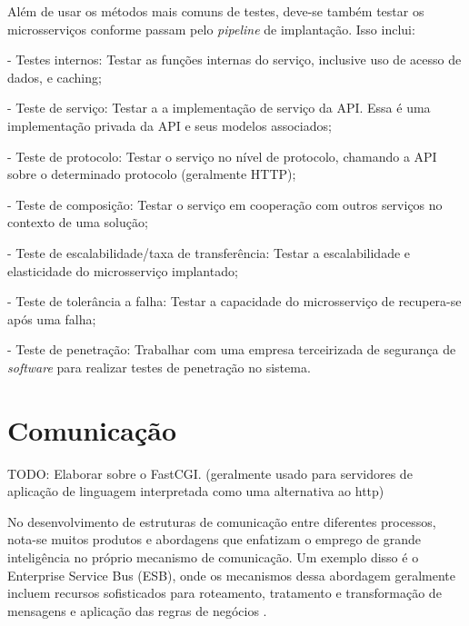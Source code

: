 
Além de usar os métodos mais comuns de testes, deve-se também testar os microsserviços conforme passam pelo \emph{pipeline} de implantação. Isso inclui: \cite{Familiar2015}

- Testes internos: Testar as funções internas do serviço, inclusive uso de acesso de dados, e caching;

- Teste de serviço: Testar a a implementação de serviço da API. Essa é uma implementação privada da API e seus modelos associados;

- Teste de protocolo: Testar o serviço no nível de protocolo, chamando a API sobre o determinado protocolo (geralmente HTTP);

- Teste de composição: Testar o serviço em cooperação com outros serviços no contexto de uma solução;

- Teste de escalabilidade/taxa de transferência: Testar a escalabilidade e elasticidade do microsserviço implantado;

- Teste de tolerância a falha: Testar a capacidade do microsserviço de recupera-se após uma falha;

- Teste de penetração: Trabalhar com uma empresa terceirizada de segurança de \emph{software} para realizar testes de penetração no sistema.

\section{Comunicação}

TODO: Elaborar sobre o FastCGI. (geralmente usado para servidores de aplicação de linguagem interpretada como uma alternativa ao http)

No desenvolvimento de estruturas de comunicação entre diferentes processos, nota-se muitos produtos e abordagens que enfatizam o emprego de grande inteligência no próprio mecanismo de comunicação. Um exemplo disso é o Enterprise Service Bus (ESB), onde os mecanismos dessa abordagem geralmente incluem recursos sofisticados para roteamento, tratamento e transformação de mensagens e aplicação das regras de negócios \cite{martin-fowler-microservices}.

